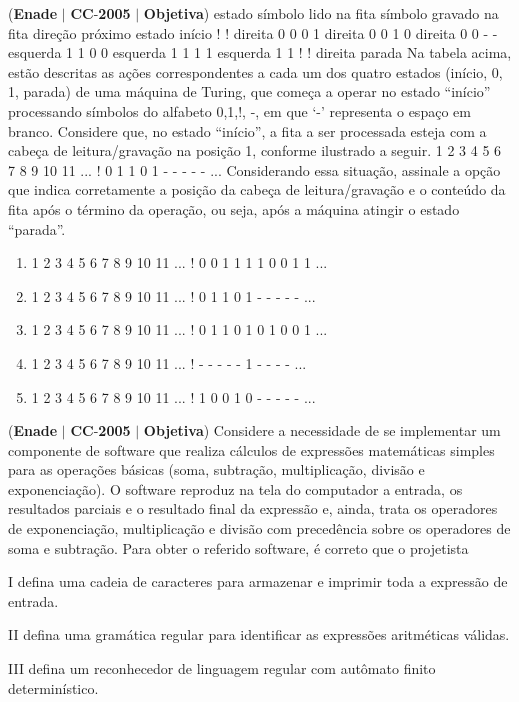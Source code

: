 \documentclass{exam}
\begin{document}
\begin{questions}
\question (\textbf{Enade} $|$ \textbf{CC}-\textbf{2005} $|$ \textbf{Objetiva})
estado
símbolo
lido na fita
símbolo gravado
na fita
direção
próximo
estado
início ! ! direita 0
0 0 1 direita 0
0 1 0 direita 0
0 - - esquerda 1
1 0 0 esquerda 1
1 1 1 esquerda 1
1 ! ! direita parada
Na tabela acima, estão descritas as ações correspondentes a cada
um dos quatro estados (início, 0, 1, parada) de uma máquina de
Turing, que começa a operar no estado “início” processando
símbolos do alfabeto {0,1,!, -}, em que ‘-’ representa o espaço
em branco. Considere que, no estado “início”, a fita a ser
processada esteja com a cabeça de leitura/gravação na posição 1,
conforme ilustrado a seguir.
1 2 3 4 5 6 7 8 9 10 11 ...
! 0 1 1 0 1 - - - - - ...
Considerando essa situação, assinale a opção que indica
corretamente a posição da cabeça de leitura/gravação e o conteúdo
da fita após o término da operação, ou seja, após a máquina atingir
o estado “parada”.
	\begin{enumerate}[label=\alph*)]
		\item 
1 2 3 4 5 6 7 8 9 10 11 ...
! 0 0 1 1 1 1 0 0 1 1 ...
		\item 
1 2 3 4 5 6 7 8 9 10 11 ...
! 0 1 1 0 1 - - - - - ...
		\item 
1 2 3 4 5 6 7 8 9 10 11 ...
! 0 1 1 0 1 0 1 0 0 1 ...
		\item 
1 2 3 4 5 6 7 8 9 10 11 ...
! - - - - - 1 - - - - ...
		\item 
1 2 3 4 5 6 7 8 9 10 11 ...
! 1 0 0 1 0 - - - - - ...
	\end{enumerate}

\question (\textbf{Enade} $|$ \textbf{CC}-\textbf{2005} $|$ \textbf{Objetiva})
Considere a necessidade de se implementar um componente de
software que realiza cálculos de expressões matemáticas simples
para as operações básicas (soma, subtração, multiplicação, divisão
e exponenciação). O software reproduz na tela do computador a
entrada, os resultados parciais e o resultado final da expressão e,
ainda, trata os operadores de exponenciação, multiplicação e
divisão com precedência sobre os operadores de soma e subtração.
Para obter o referido software, é correto que o projetista

I defina uma cadeia de caracteres para armazenar e imprimir toda
a expressão de entrada.

II defina uma gramática regular para identificar as expressões
aritméticas válidas.

III defina um reconhecedor de linguagem regular com autômato
finito determinístico.


\end{questions}
\end{document}
